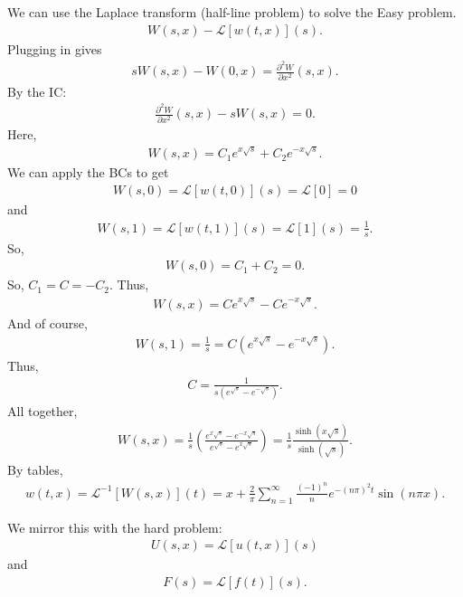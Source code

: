 \documentclass{book}
\theoremstyle{definition}
\newcommand{\p}{\partial}
\newcommand{\lag}{\mathcal{L}}
\newcommand{\f}[2]{\frac{#1}{#2}}
\newcommand{\lp}{\left(}
\newcommand{\rp}{\right)}
\begin{document}
We can use the Laplace transform (half-line problem) to solve the Easy problem. 
\begin{align*}
W(s,x) - \lag[w(t,x)](s).
\end{align*}
Plugging in gives
\begin{align*}
sW(s,x) - W(0,x) = \f{\p^2 W}{\p x^2}(s,x).
\end{align*}
By the IC:
\begin{align*}
\f{\p^2 W}{\p x^2}(s,x) - sW(s,x) = 0.
\end{align*}
Here,
\begin{align*}
W(s,x) = C_1 e^{x\sqrt{s}} + C_2 e^{-x\sqrt{s}}.
\end{align*}
We can apply the BCs to get
\begin{align*}
W(s,0) = \lag[w(t,0)](s) = \lag[0] = 0
\end{align*}
and
\begin{align*}
W(s,1) = \lag[w(t,1)](s) = \lag[1](s) = \f{1}{s}.
\end{align*}
So,
\begin{align*}
W(s,0) = C_1 + C_2 = 0.
\end{align*}
So, $C_1 = C = -C_2$. Thus,
\begin{align*}
W(s,x) = C e^{x\sqrt{s}} - C e^{-x\sqrt{s}}.
\end{align*}
And of course,
\begin{align*}
W(s,1) = \f{1}{s} = C\lp e^{x\sqrt{s}} - e^{-x\sqrt{s}}\rp.
\end{align*}
Thus,
\begin{align*}
C = \f{1}{s\lp e^{\sqrt{s}} - e^{-\sqrt{s}}\rp}.
\end{align*}
All together,
\begin{align*}
W(s,x) = \f{1}{s}\lp \f{e^{x\sqrt{s}} - e^{-x\sqrt{s}}}{e^{\sqrt{s}} - e^{x\sqrt{s}}} \rp = \f{1}{s}\f{\sinh(x\sqrt{s})}{\sinh(\sqrt{s})}.
\end{align*}
By tables, 
\begin{align*}
w(t,x) = \lag^{-1}[W(s,x)](t) = x + \f{2}{\pi}\sum^\infty_{n=1}\f{(-1)^n}{n}e^{-(n\pi)^2t}\sin(n\pi x).
\end{align*}

We mirror this with the hard problem:
\begin{align*}
U(s,x) = \lag[u(t,x)](s)
\end{align*}
and
\begin{align*}
F(s) = \lag[f(t)](s).
\end{align*}
\end{document}

